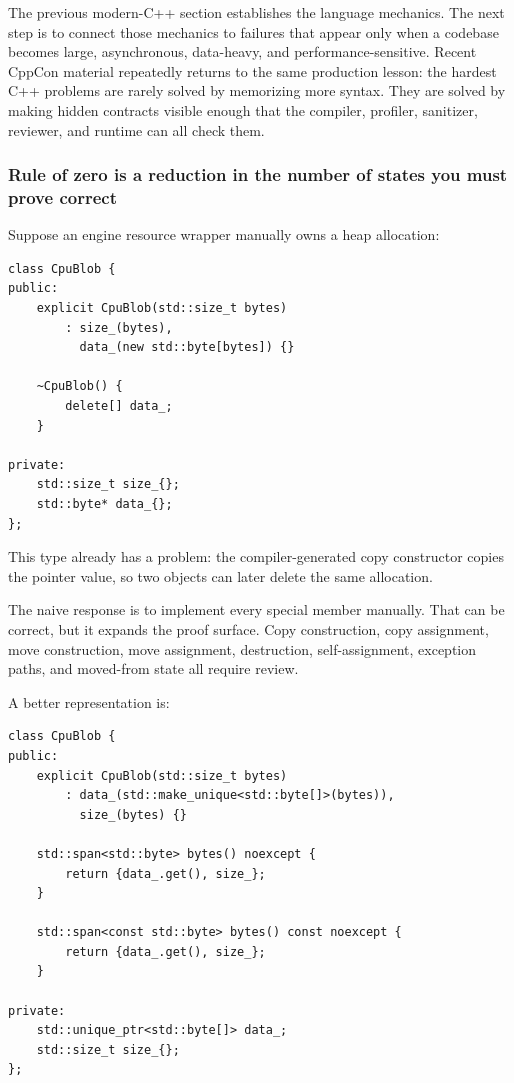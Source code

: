 The previous modern-C++ section establishes the language mechanics. The next step is to connect those mechanics to failures that appear only when a codebase becomes large, asynchronous, data-heavy, and performance-sensitive. Recent CppCon material repeatedly returns to the same production lesson: the hardest C++ problems are rarely solved by memorizing more syntax. They are solved by making hidden contracts visible enough that the compiler, profiler, sanitizer, reviewer, and runtime can all check them.

\subsubsection{Rule of zero is a reduction in the number of states you must prove correct}\label{01-foundations-i-ch005-rule-of-zero-is-a-reduction-in-the-number-of-states-you-must-prove-correct}

Suppose an engine resource wrapper manually owns a heap allocation:

\begin{verbatim}
class CpuBlob {
public:
    explicit CpuBlob(std::size_t bytes)
        : size_(bytes),
          data_(new std::byte[bytes]) {}

    ~CpuBlob() {
        delete[] data_;
    }

private:
    std::size_t size_{};
    std::byte* data_{};
};
\end{verbatim}

This type already has a problem: the compiler-generated copy constructor copies the pointer value, so two objects can later delete the same allocation.

The naive response is to implement every special member manually. That can be correct, but it expands the proof surface. Copy construction, copy assignment, move construction, move assignment, destruction, self-assignment, exception paths, and moved-from state all require review.

A better representation is:

\begin{verbatim}
class CpuBlob {
public:
    explicit CpuBlob(std::size_t bytes)
        : data_(std::make_unique<std::byte[]>(bytes)),
          size_(bytes) {}

    std::span<std::byte> bytes() noexcept {
        return {data_.get(), size_};
    }

    std::span<const std::byte> bytes() const noexcept {
        return {data_.get(), size_};
    }

private:
    std::unique_ptr<std::byte[]> data_;
    std::size_t size_{};
};
\end{verbatim}

